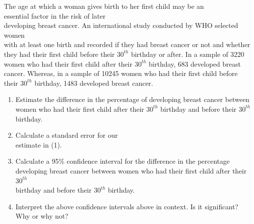 \documentclass[11pt, chapterprefix=true]{scrbook}\usepackage[]{graphicx}\usepackage[]{color}
\begin{document}
\begin{exercises}
  \begin{exercise} %

The age at which a woman gives birth to her first child may be an \\ essential factor in the risk of later \\ developing breast cancer.  An international study conducted by WHO selected women \\ with at least one birth and recorded if they had breast cancer or not and whether they had their first child before their $30^{th}$ birthday or after. In a sample of 3220 women who had their first child after their $30^{th}$ birthday, 683 developed breast cancer.  Whereas, in a sample of 10245 women who had their first child before their $30^{th}$ birthday, 1483 developed breast cancer.

	  \begin{enumerate}
	  \item Estimate the difference in the percentage of developing breast cancer between \\ women who had their first child after their $30^{th}$ birthday and before their $30^{th}$ birthday.
    \item Calculate a standard error for our \\ estimate in (1).
    \item Calculate a 95\% confidence interval for the difference in the percentage developing breast cancer between women who had their first child after their $30^{th}$ \\ birthday and before their $30^{th}$ birthday.
    \item Interpret the above confidence intervals above in context.  Is it significant? Why or why not?
	  \end{enumerate}
  \end{exercise}
  \begin{solution}  %


\end{solution}
\end{exercises}
\end{document}
